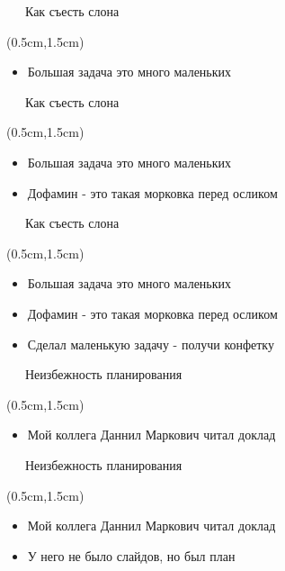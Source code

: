 \documentclass[xetex,18pt,aspectratio=43]{beamer}
\begin{document}
\begin{Large}
\begin{frame}{\ \ \ Как съесть слона}
\begin{textblock*}{\framewidth-0.8cm}(0.5cm,1.5cm)
\begin{itemize}
  \item Большая задача это много маленьких
\end{itemize}
\end{textblock*}
\end{frame}

\begin{frame}{\ \ \ Как съесть слона}
\begin{textblock*}{\framewidth-0.8cm}(0.5cm,1.5cm)
\begin{itemize}
  \item Большая задача это много маленьких
  \item Дофамин - это такая морковка перед осликом
\end{itemize}
\end{textblock*}
\end{frame}

\begin{frame}{\ \ \ Как съесть слона}
\begin{textblock*}{\framewidth-0.8cm}(0.5cm,1.5cm)
\begin{itemize}
  \item Большая задача это много маленьких
  \item Дофамин - это такая морковка перед осликом
  \item Сделал маленькую задачу - получи конфетку
\end{itemize}
\end{textblock*}
\end{frame}

\begin{frame}{\ \ \ Неизбежность планирования}
\begin{textblock*}{\framewidth-0.8cm}(0.5cm,1.5cm)
\begin{itemize}
  \item Мой коллега Даннил Маркович читал доклад
\end{itemize}
\end{textblock*}
\end{frame}

\begin{frame}{\ \ \ Неизбежность планирования}
\begin{textblock*}{\framewidth-0.8cm}(0.5cm,1.5cm)
\begin{itemize}
  \item Мой коллега Даннил Маркович читал доклад
  \item У него не было слайдов, но был план
\end{itemize}
\end{textblock*}
\end{frame}


\end{Large}
\end{document}
